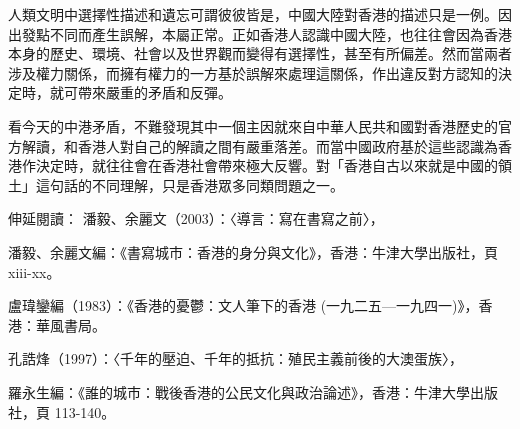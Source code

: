 人類文明中選擇性描述和遺忘可謂彼彼皆是，中國大陸對香港的描述只是一例。因出發點不同而產生誤解，本屬正常。正如香港人認識中國大陸，也往往會因為香港本身的歷史、環境、社會以及世界觀而變得有選擇性，甚至有所偏差。然而當兩者涉及權力關係，而擁有權力的一方基於誤解來處理這關係，作出違反對方認知的決定時，就可帶來嚴重的矛盾和反彈。

看今天的中港矛盾，不難發現其中一個主因就來自中華人民共和國對香港歷史的官方解讀，和香港人對自己的解讀之間有嚴重落差。而當中國政府基於這些認識為香港作決定時，就往往會在香港社會帶來極大反響。對「香港自古以來就是中國的領土」這句話的不同理解，只是香港眾多同類問題之一。


伸延閱讀：
潘毅、余麗文（2003）：〈導言：寫在書寫之前〉，

潘毅、余麗文編：《書寫城市：香港的身分與文化》，香港：牛津大學出版社，頁 xiii-xx。

盧瑋鑾編（1983）：《香港的憂鬱：文人筆下的香港 (一九二五—一九四一)》，香港：華風書局。

孔誥烽（1997）：〈千年的壓迫、千年的抵抗：殖民主義前後的大澳蛋族〉，

羅永生編：《誰的城市：戰後香港的公民文化與政治論述》，香港：牛津大學出版社，頁 113-140。